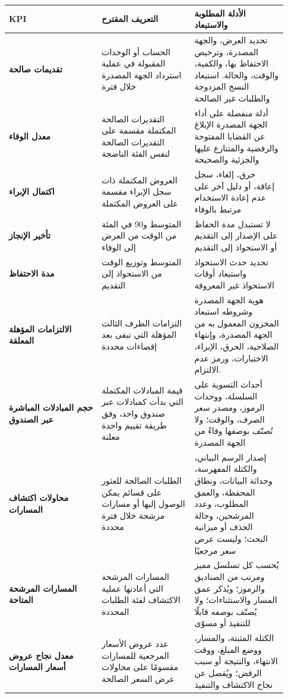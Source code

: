 \documentclass[11pt]{article}
\begin{document}
\begin{longtable}{P{0.31\linewidth} P{0.31\linewidth} P{0.31\linewidth}}
\toprule
KPI & التعريف المقترح & الأدلة المطلوبة والاستبعاد \\
\midrule
\endhead
\textbf{تقديمات صالحة} & الحساب أو الوحدات المقبولة في عملية استرداد الجهة المصدرة خلال فترة & تحديد العرض، والجهة المصدرة، وترخيص الاحتفاظ بها، والكمية، والوقت، والحالة. استبعاد النسخ المزدوجة والطلبات غير الصالحة \\
\textbf{معدل الوفاء} & التقديرات الصالحة المكتملة مقسمة على التقديرات الصالحة لنفس الفئة الناضجة & أدلة منفصلة على أداء الجهة المصدرة الإبلاغ عن القضايا المفتوحة والرفضية والمتنازع عليها والجزئية والصحيحة \\
\textbf{اكتمال الإبراء} & العروض المكتملة ذات سجل الإبراء مقسمة على العروض المكتملة & حرق، إلغاء، سجل إعاقة، أو دليل آخر على عدم إعادة الاستخدام مرتبط بالوفاء \\
\textbf{تأخير الإنجاز} & المتوسط و90 في المئة من الوقت من العرض إلى الوفاء & لا تستبدل مدة الحفاظ على الإصدار إلى التقديم أو الاستحواذ إلى التقديم \\
\textbf{مدة الاحتفاظ} & المتوسط وتوزيع الوقت من الاستحواذ إلى التقديم & تحديد حدث الاستحواذ واستبعاد أوقات الاستحواذ غير المعروفة \\
\textbf{الالتزامات المؤهلة المعلقة} & التزامات الطرف الثالث المؤهلة التي تبقى بعد إقصاءات محددة & هوية الجهة المصدرة وشروطه استبعاد المخزون المعمول به من الجهة المصدرة، وإنتهاء الصلاحية، الحرق، الإبراء، الاختبارات، ورمز عدم الالتزام. \\
\textbf{حجم المبادلات المباشرة عبر الصندوق} & قيمة المبادلات المكتملة التي بدأت كمبادلات عبر صندوق واحد، وفق طريقة تقييم واحدة معلنة & أحداث التسوية على السلسلة، ووحدات الرموز، ومصدر سعر الصرف، والوقت؛ ولا تُصنّف بوصفها وفاءً من الجهة المصدرة \\
\textbf{محاولات اكتشاف المسارات} & الطلبات الصالحة للعثور على قسائم يمكن الوصول إليها أو مسارات مرشحة خلال فترة محددة & إصدار الرسم البياني، والكتلة المفهرسة، وحداثة البيانات، ونطاق المحفظة، والعمق المطلوب، وعدد المرشحين، وحالة الحذف أو ميزانية البحث؛ وليست عرض سعر مرجعيًا \\
\textbf{المسارات المرشحة المتاحة} & المسارات المرشحة التي أعادتها عملية الاكتشاف لفئة الطلبات المحددة & يُحسب كل تسلسل مميز ومرتب من الصناديق والرموز؛ ويُذكر عمق المسار والاستثناءات؛ ولا يُصنّف بوصفه قابلًا للتنفيذ أو مسوّى \\
\textbf{معدل نجاح عروض أسعار المسارات} & عدد عروض الأسعار المرجعية للمسارات مقسومًا على محاولات عرض السعر الصالحة & الكتلة المثبتة، والمسار، ووضع المبلغ، ووقت الانتهاء، والنتيجة أو سبب الرفض؛ ويُفصل عن نجاح الاكتشاف والتنفيذ \\

\end{longtable}
\end{document}

